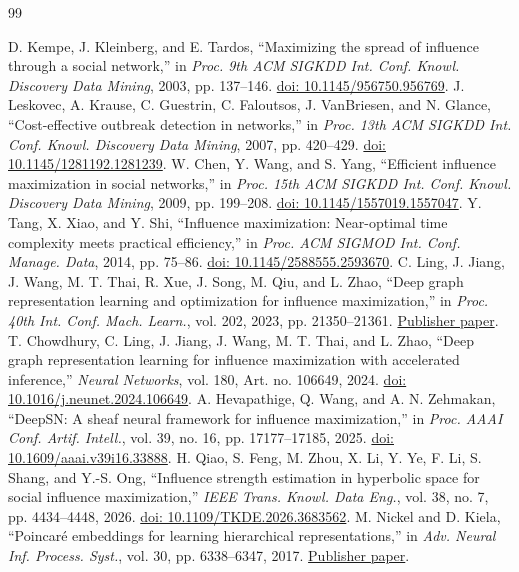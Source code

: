 \documentclass[journal]{IEEEtran}
\begin{document}
\begin{thebibliography}{99}
\raggedright
{} D. Kempe, J. Kleinberg, and E. Tardos, ``Maximizing the spread of influence through a social network,'' in \emph{Proc. 9th ACM SIGKDD Int. Conf. Knowl. Discovery Data Mining}, 2003, pp. 137--146. \href{https://doi.org/10.1145/956750.956769}{doi: 10.1145/956750.956769}.
 J. Leskovec, A. Krause, C. Guestrin, C. Faloutsos, J. VanBriesen, and N. Glance, ``Cost-effective outbreak detection in networks,'' in \emph{Proc. 13th ACM SIGKDD Int. Conf. Knowl. Discovery Data Mining}, 2007, pp. 420--429. \href{https://doi.org/10.1145/1281192.1281239}{doi: 10.1145/1281192.1281239}.
 W. Chen, Y. Wang, and S. Yang, ``Efficient influence maximization in social networks,'' in \emph{Proc. 15th ACM SIGKDD Int. Conf. Knowl. Discovery Data Mining}, 2009, pp. 199--208. \href{https://doi.org/10.1145/1557019.1557047}{doi: 10.1145/1557019.1557047}.
 Y. Tang, X. Xiao, and Y. Shi, ``Influence maximization: Near-optimal time complexity meets practical efficiency,'' in \emph{Proc. ACM SIGMOD Int. Conf. Manage. Data}, 2014, pp. 75--86. \href{https://doi.org/10.1145/2588555.2593670}{doi: 10.1145/2588555.2593670}.
 C. Ling, J. Jiang, J. Wang, M. T. Thai, R. Xue, J. Song, M. Qiu, and L. Zhao, ``Deep graph representation learning and optimization for influence maximization,'' in \emph{Proc. 40th Int. Conf. Mach. Learn.}, vol. 202, 2023, pp. 21350--21361. \href{https://proceedings.mlr.press/v202/ling23b.html}{Publisher paper}.
 T. Chowdhury, C. Ling, J. Jiang, J. Wang, M. T. Thai, and L. Zhao, ``Deep graph representation learning for influence maximization with accelerated inference,'' \emph{Neural Networks}, vol. 180, Art. no. 106649, 2024. \href{https://doi.org/10.1016/j.neunet.2024.106649}{doi: 10.1016/j.neunet.2024.106649}.
 A. Hevapathige, Q. Wang, and A. N. Zehmakan, ``DeepSN: A sheaf neural framework for influence maximization,'' in \emph{Proc. AAAI Conf. Artif. Intell.}, vol. 39, no. 16, pp. 17177--17185, 2025. \href{https://doi.org/10.1609/aaai.v39i16.33888}{doi: 10.1609/aaai.v39i16.33888}.
 H. Qiao, S. Feng, M. Zhou, X. Li, Y. Ye, F. Li, S. Shang, and Y.-S. Ong, ``Influence strength estimation in hyperbolic space for social influence maximization,'' \emph{IEEE Trans. Knowl. Data Eng.}, vol. 38, no. 7, pp. 4434--4448, 2026. \href{https://doi.org/10.1109/TKDE.2026.3683562}{doi: 10.1109/TKDE.2026.3683562}.
 M. Nickel and D. Kiela, ``Poincar\'e embeddings for learning hierarchical representations,'' in \emph{Adv. Neural Inf. Process. Syst.}, vol. 30, pp. 6338--6347, 2017. \href{https://proceedings.neurips.cc/paper/2017/hash/59dfa2df42d9e3d41f5b02bfc32229dd-Abstract.html}{Publisher paper}.

\end{thebibliography}
\end{document}
